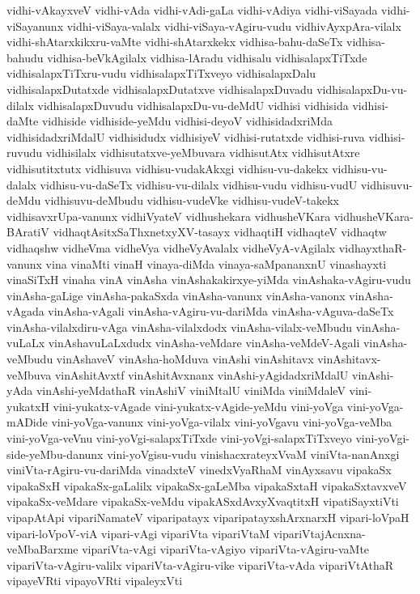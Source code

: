 {vidhi-vAkayxveV
vidhi-vAda
vidhi-vAdi-gaLa
vidhi-vAdiya
vidhi-viSayada
vidhi-viSayanunx
vidhi-viSaya-valalx
vidhi-viSaya-vAgiru-vudu
vidhivAyxpAra-vilalx
vidhi-shAtarxkikxru-vaMte
vidhi-shAtarxkekx
vidhisa-bahu-daSeTx
vidhisa-bahudu
vidhisa-beVkAgilalx
vidhisa-lAradu
vidhisalu
vidhisalapxTiTxde
vidhisalapxTiTxru-vudu
vidhisalapxTiTxveyo
vidhisalapxDalu
vidhisalapxDutatxde
vidhisalapxDutatxve
vidhisalapxDuvadu
vidhisalapxDu-vu-dilalx
vidhisalapxDuvudu
vidhisalapxDu-vu-deMdU
vidhisi
vidhisida
vidhisi-daMte
vidhiside
vidhiside-yeMdu
vidhisi-deyoV
vidhisidadxriMda
vidhisidadxriMdalU
vidhisidudx
vidhisiyeV
vidhisi-rutatxde
vidhisi-ruva
vidhisi-ruvudu
vidhisilalx
vidhisutatxve-yeMbuvara
vidhisutAtx
vidhisutAtxre
vidhisutitxtutx
vidhisuva
vidhisu-vudakAkxgi
vidhisu-vu-dakekx
vidhisu-vu-dalalx
vidhisu-vu-daSeTx
vidhisu-vu-dilalx
vidhisu-vudu
vidhisu-vudU
vidhisuvu-deMdu
vidhisuvu-deMbudu
vidhisu-vudeVke
vidhisu-vudeV-takekx
vidhisavxrUpa-vanunx
vidhiVyateV
vidhushekara
vidhusheVKara
vidhusheVKara-BAratiV
vidhaqtAsitxSaThxnetxyXV-tasayx
vidhaqtiH
vidhaqteV
vidhaqtw
vidhaqshw
vidheVma
vidheVya
vidheVyAvalalx
vidheVyA-vAgilalx
vidhayxthaR-vanunx
vina
vinaMti
vinaH
vinaya-diMda
vinaya-saMpananxnU
vinashayxti
vinaSiTxH
vinaha
vinA
vinAsha
vinAshakakirxye-yiMda
vinAshaka-vAgiru-vudu
vinAsha-gaLige
vinAsha-pakaSxda
vinAsha-vanunx
vinAsha-vanonx
vinAsha-vAgada
vinAsha-vAgali
vinAsha-vAgiru-vu-dariMda
vinAsha-vAguva-daSeTx
vinAsha-vilalxdiru-vAga
vinAsha-vilalxdodx
vinAsha-vilalx-veMbudu
vinAsha-vuLaLx
vinAshavuLaLxdudx
vinAsha-veMdare
vinAsha-veMdeV-Agali
vinAsha-veMbudu
vinAshaveV
vinAsha-hoMduva
vinAshi
vinAshitavx
vinAshitavx-veMbuva
vinAshitAvxtf
vinAshitAvxnanx
vinAshi-yAgidadxriMdalU
vinAshi-yAda
vinAshi-yeMdathaR
vinAshiV
viniMtalU
viniMda
viniMdaleV
vini-yukatxH
vini-yukatx-vAgade
vini-yukatx-vAgide-yeMdu
vini-yoVga
vini-yoVga-mADide
vini-yoVga-vanunx
vini-yoVga-vilalx
vini-yoVgavu
vini-yoVga-veMba
vini-yoVga-veVnu
vini-yoVgi-salapxTiTxde
vini-yoVgi-salapxTiTxveyo
vini-yoVgi-side-yeMbu-danunx
vini-yoVgisu-vudu
vinishacxrateyxVvaM
viniVta-nanAnxgi
viniVta-rAgiru-vu-dariMda
vinadxteV
vinedxVyaRhaM
vinAyxsavu
vipakaSx
vipakaSxH
vipakaSx-gaLalilx
vipakaSx-gaLeMba
vipakaSxtaH
vipakaSxtavxveV
vipakaSx-veMdare
vipakaSx-veMdu
vipakASxdAvxyXvaqtitxH
vipatiSayxtiVti
vipapAtApi
vipariNamateV
viparipatayx
viparipatayxshArxnarxH
vipari-loVpaH
vipari-loVpoV-viA
vipari-vAgi
vipariVta
vipariVtaM
vipariVtajAcnxna-veMbaBarxme
vipariVta-vAgi
vipariVta-vAgiyo
vipariVta-vAgiru-vaMte
vipariVta-vAgiru-valilx
vipariVta-vAgiru-vike
vipariVta-vAda
vipariVtAthaR
vipayeVRti
vipayoVRti
vipaleyxVti
}
